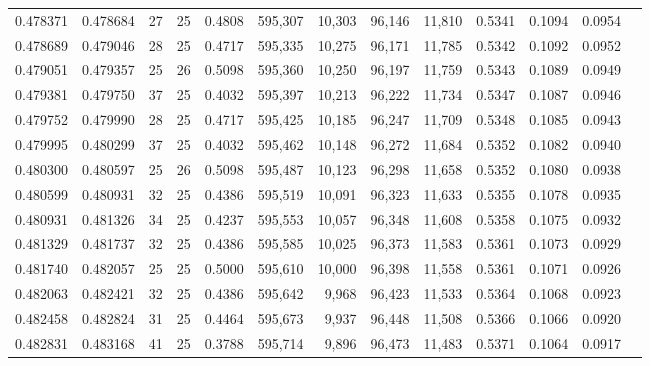 \begin{tabular}{rrrrrrrrrrrrr}
0.478371 & 0.478684 &    27 &  25 &                                     0.4808 & 595,307 &  10,303 &  96,146 &  11,810 & 0.5341 & 0.1094 & 0.0954 \\
0.478689 & 0.479046 &    28 &  25 &                                     0.4717 & 595,335 &  10,275 &  96,171 &  11,785 & 0.5342 & 0.1092 & 0.0952 \\
0.479051 & 0.479357 &    25 &  26 &                                     0.5098 & 595,360 &  10,250 &  96,197 &  11,759 & 0.5343 & 0.1089 & 0.0949 \\
0.479381 & 0.479750 &    37 &  25 &                                     0.4032 & 595,397 &  10,213 &  96,222 &  11,734 & 0.5347 & 0.1087 & 0.0946 \\
0.479752 & 0.479990 &    28 &  25 &                                     0.4717 & 595,425 &  10,185 &  96,247 &  11,709 & 0.5348 & 0.1085 & 0.0943 \\
0.479995 & 0.480299 &    37 &  25 &                                     0.4032 & 595,462 &  10,148 &  96,272 &  11,684 & 0.5352 & 0.1082 & 0.0940 \\
0.480300 & 0.480597 &    25 &  26 &                                     0.5098 & 595,487 &  10,123 &  96,298 &  11,658 & 0.5352 & 0.1080 & 0.0938 \\
0.480599 & 0.480931 &    32 &  25 &                                     0.4386 & 595,519 &  10,091 &  96,323 &  11,633 & 0.5355 & 0.1078 & 0.0935 \\
0.480931 & 0.481326 &    34 &  25 &                                     0.4237 & 595,553 &  10,057 &  96,348 &  11,608 & 0.5358 & 0.1075 & 0.0932 \\
0.481329 & 0.481737 &    32 &  25 &                                     0.4386 & 595,585 &  10,025 &  96,373 &  11,583 & 0.5361 & 0.1073 & 0.0929 \\
0.481740 & 0.482057 &    25 &  25 &                                     0.5000 & 595,610 &  10,000 &  96,398 &  11,558 & 0.5361 & 0.1071 & 0.0926 \\
0.482063 & 0.482421 &    32 &  25 &                                     0.4386 & 595,642 &   9,968 &  96,423 &  11,533 & 0.5364 & 0.1068 & 0.0923 \\
0.482458 & 0.482824 &    31 &  25 &                                     0.4464 & 595,673 &   9,937 &  96,448 &  11,508 & 0.5366 & 0.1066 & 0.0920 \\
0.482831 & 0.483168 &    41 &  25 &                                     0.3788 & 595,714 &   9,896 &  96,473 &  11,483 & 0.5371 & 0.1064 & 0.0917 \\

\end{tabular}
